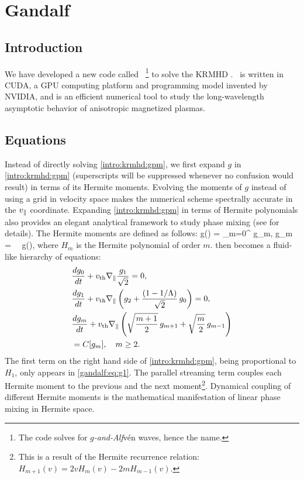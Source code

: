 \chapter{Gandalf}
\label{chap:gandalf}

\section{Introduction}
    We have developed a new code called \Gand\ \footnote{The code solves for
    \textit{$g$-and-Alf}v\'{e}n waves, hence the name.} to solve the KRMHD
    . \Gand\,
    is written in CUDA, a GPU computing platform and programming model invented by NVIDIA,
    and is an efficient numerical tool to study the long-wavelength asymptotic behavior
    of anisotropic magnetized plasmas.

\section{Equations}
    
     Instead of directly solving \eqref{intro:krmhd:gpm}, we first expand $g$ in
     \eqref{intro:krmhd:gpm} (superscripts will be suppressed whenever no confusion would
     result) in terms of its Hermite moments. Evolving
    the moments of $g$ instead of using a grid in velocity space makes the numerical
    scheme spectrally accurate in the $v_\parallel$ coordinate. 
    Expanding \eqref{intro:krmhd:gpm} in terms of Hermite polynomials also provides an
	elegant analytical framework to study phase mixing (see
	 for details).
    The Hermite moments are defined as follows:
    \beq
    g(\vpar) = \sum_{m=0}^\infty {} g_m, \quad
    g_m = \int \rmd \vpar\, \, g(\vpar), 
    \eeq
    where $H_m$ is the Hermite polynomial of order $m$.  then becomes a
    fluid-like hierarchy of equations:
    \begin{align}
        \label{gandalf:eq:g0}
        &\frac{d g_0}{d t} + v_{\rm th} \nabla_\parallel\frac{g_1}{\sqrt{2}}  = 0, \\
        \label{gandalf:eq:g1}
        &\frac{d g_1}{d t} + v_{\rm th} \nabla_\parallel\left(g_2 + \frac{\left(1-1/\Lambda\right)}{\sqrt{2}}\,g_0\right)
        = 0,\\
        &\frac{d g_m}{d t} + v_{\rm th} \nabla_\parallel\left(\sqrt{\frac{m+1}{2}}\,g_{m+1} +
        \sqrt{\frac{m}{2}}\,g_{m-1}\right) \nonumber \\
        &= C[g_m],  \quad m\ge2.
        \label{gandalf:eq:gmeq}
    \end{align}
    The first term on the right hand side of \eqref{intro:krmhd:gpm}, being proportional to 
    $H_1$, only appears in \eqref{gandalf:eq:g1}. The parallel
    streaming term couples each Hermite moment to the previous and the next moment\footnote{This is a result of the Hermite recurrence relation: $H_{m+1}(v) = 2 v
	H_m(v)- 2 m H_{m-1}(v)$.}. Dynamical coupling of different Hermite moments
    is the mathematical manifestation of linear phase mixing in Hermite space. 

